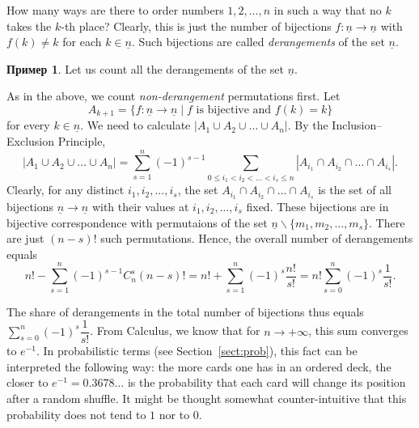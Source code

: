 \documentclass[12pt,notitlepage]{article}
\theoremstyle{plain}
\theoremstyle{definition}
\newtheorem{exm}[thm]{Пример}
\theoremstyle{plain}
\renewcommand{\setminus}{\smallsetminus}
\newcommand{\ul}[1]{\underline{#1}}
\newcommand{\1}{\mathbf{1}}
\newcommand{\0}{\mathbf{0}}
\begin{document}
How many ways are there to order numbers $1, 2, \ldots, n$ in such a way that no $k$ takes the $k$-th place? Clearly, this is just the number of bijections $f\colon\ul{n} \to \ul{n}$ with $f(k) \neq k$ for each $k \in \ul{n}$. Such bijections are called \emph{derangements} of the set $\ul{n}$.
\begin{exm}
	Let us count all the derangements of the set $\ul{n}$.
	
	As in the above, we count \emph{non-derangement} permutations first. Let
	$$A_{k + 1} = \{f\colon \ul{n} \to \ul{n} \mid f\mbox{ is bijective and } f(k) = k\}$$
	for every $k \in \ul{n}$. We need to calculate $|A_1 \cup A_2 \cup\ldots\cup A_n|$. By the Inclusion--Exclusion Principle,
	$$|A_1 \cup A_2 \cup \ldots \cup A_n| = \sum\limits_{s = 1}^{n} (-1)^{s - 1} \sum\limits_{0 \leqslant i_1 < i_2 < \ldots < i_s  \leq n} |A_{i_1} \cap A_{i_2} \cap \ldots \cap A_{i_s}|.$$
	Clearly, for any distinct $i_1, i_2, \ldots, i_s$, the set $A_{i_1} \cap A_{i_2} \cap \ldots \cap A_{i_s}$ is the set of all bijections $\ul{n} \to \ul{n}$ with their values at $i_1, i_2,\ldots, i_s$ fixed. These bijections are in bijective correspondence with permutaions of the set $\ul{n}\setminus \{m_1,m_2,\ldots,m_s\}$. There are just $(n-s)!$ such permutations. Hence, the overall number of derangements equals
	$$n! - \sum\limits_{s = 1}^{n} (-1)^{s - 1} C_{n}^s (n-s)! = n! + \sum\limits_{s = 1}^{n} (-1)^{s} \dfrac{n!}{s!} = n!\sum\limits_{s = 0}^{n} (-1)^{s} \dfrac{1}{s!}.$$
\end{exm}
The share of derangements in the total number of bijections thus equals $\sum\limits_{s = 0}^{n} (-1)^{s} \dfrac{1}{s!}$. From Calculus, we know that for $n \to +\infty$, this sum converges to $e^{-1}$. In probabilistic terms (see Section~\ref{sect:prob}), this fact can be interpreted the following way: the more cards one has in an ordered deck, the closer to $e^{-1} = 0.3678\ldots$ is the probability that each card will change its position after a random shuffle. It might be thought somewhat counter-intuitive that this probability does not tend to $1$ nor to $0$.
\end{document}
